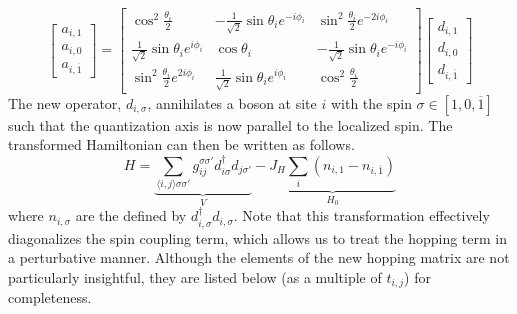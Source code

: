 \begin{equation}
    \begin{bmatrix}
        a_{i, 1} \\
        a_{i, 0} \\ 
        a_{i, \overline{1}}
    \end{bmatrix} = 
    \begin{bmatrix}
        \cos^2\frac{\theta_i}{2} & -\frac{1}{\sqrt{2}} \sin\theta_i e^{-i\phi_i} & \sin^2\frac{\theta_i}{2}e^{-2i\phi_i} \\ 
        \frac{1}{\sqrt{2}} \sin\theta_i e^{i\phi_i} & \cos\theta_i & -\frac{1}{\sqrt{2}} \sin\theta_i e^{-i\phi_i} \\
        \sin^2\frac{\theta_i}{2}e^{2i\phi_i} & \frac{1}{\sqrt{2}} \sin\theta_i e^{i\phi_i} & \cos^2\frac{\theta_i}{2}
    \end{bmatrix}
    \begin{bmatrix}
        d_{i, 1} \\
        d_{i, 0} \\ 
        d_{i, \overline{1}}  
    \end{bmatrix}
\end{equation}
The new operator, $d_{i, \sigma}$, annihilates a boson at site $i$ with the spin $\sigma \in [1, 0, \overline{1}]$ such that the quantization axis is now parallel to the localized spin. The transformed Hamiltonian can then be written as follows.
\begin{equation}
    H = \underbrace{\sum_{\langle i, j\rangle \sigma \sigma'}g_{ij}^{\sigma \sigma'} d_{i\sigma}^{\dagger} d_{j\sigma'}}_{V} - \underbrace{J_H\sum_i (n_{i,1} - n_{i, \overline{1}})}_{H_0}
\end{equation}
where $n_{i, \sigma}$ are the defined by $d_{i, \sigma}^{\dagger} d_{i, \sigma}$. Note that this transformation effectively diagonalizes the spin coupling term, which allows us to treat the hopping term in a perturbative manner. Although the elements of the new hopping matrix are not particularly insightful, they are listed below (as a multiple of $t_{i, j}$) for completeness.

